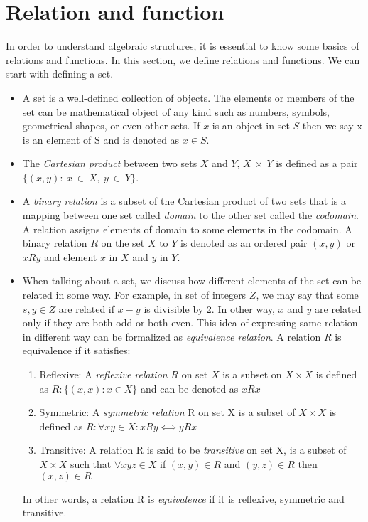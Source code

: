 \section{Relation and function}
In order to understand algebraic structures, it is essential to know some basics
of relations and functions. In this section, we define relations and functions.
We can start with defining a set.
\begin{itemize}
\item A set is a well-defined collection of objects. The elements or members of the
set can be mathematical object of any kind such as numbers, symbols, geometrical
shapes, or even other sets. If $x$ is an object in set $S$ then we say x is an
element of S and is denoted as $x \in S$.

\item The \emph{Cartesian product} between two sets $X$ and $Y$,  $X \ \times\
Y$ is defined as a pair \(\{(x,y) :\ x \ \in\ X,\ y\ \in\ Y \}\). 

\item A \emph{binary relation} is a subset of the Cartesian product of two sets that
is a mapping between one set called \textit{domain} to the other set called the
\textit{codomain}. A relation assigns elements of domain to some elements in
the codomain. A binary relation $R$ on the set $X$ to $Y$ is denoted as an
ordered pair $(x,y)$ or $xRy$ and element $x$ in $X$ and $y$ in $Y$.

\item When talking about a set, we discuss how different elements of the set can
be related in some way. For example, in set of integers $Z$, we may say that
some $s,y \in Z$ are related if $x-y$ is divisible by 2. In other way, $x$ and
$y$ are related only if they are both odd or both even. This idea of expressing
same relation in different way can be formalized as \textit{equivalence
relation}. A relation $R$ is equivalence if it satisfies:
\begin{enumerate}
    \item Reflexive: A \emph{reflexive relation} $R$ on set $X$ is a
subset on \(X \times X\)  is defined as \( R : \{(x,x) : x \in X\}\) and can be
denoted as $xRx$

    \item Symmetric: A \emph{symmetric relation} R on set X is a subset of \(X
\times X\) is defined as \(R: \forall x y \in X: xRy ⟺ yRx\)

    \item Transitive: A relation R is said to be \emph{transitive} on set X, is
a subset of \(X \times X\) such that \(∀ x y z \in X \) if \((x,y) \in R\) and
\((y,z) \in R \) then \((x,z) \in R\)
\end{enumerate}
In other words, a relation R is \emph{equivalence} if it is reflexive, symmetric and transitive.


\end{itemize}

